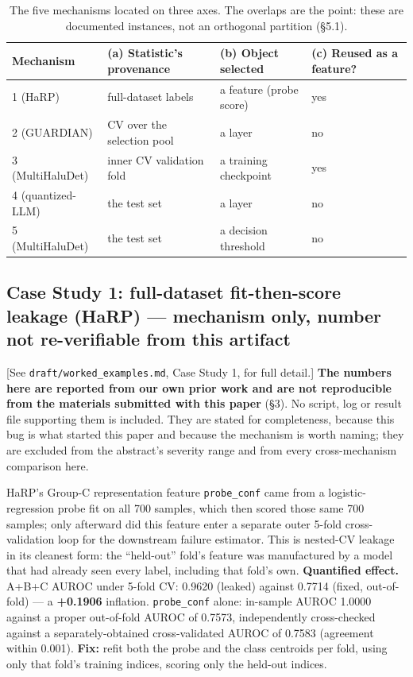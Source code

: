 \documentclass[10pt]{article} %
\begin{document}
\begin{table}[!ht]
\centering
\small
\begin{tabular}{llll}
\toprule
Mechanism & (a) Statistic's provenance & (b) Object selected & (c) Reused as a feature? \\
\midrule
1 (HaRP) & full-dataset labels & a feature (probe score) & yes \\
2 (GUARDIAN) & CV over the selection pool & a layer & no \\
3 (MultiHaluDet) & inner CV validation fold & a training checkpoint & yes \\
4 (quantized-LLM) & the test set & a layer & no \\
5 (MultiHaluDet) & the test set & a decision threshold & no \\
\bottomrule
\end{tabular}
\caption{The five mechanisms located on three axes. The overlaps are the
point: these are documented instances, not an orthogonal partition (§5.1).}
\end{table}

\subsection{Case Study 1: full-dataset fit-then-score leakage (HaRP) --- mechanism only, number not re-verifiable from this artifact}

[See \texttt{draft/worked\_examples.md}, Case Study 1, for full detail.]
\textbf{The numbers here are reported from our own prior work and are not
reproducible from the materials submitted with this paper} (§3). No script, log
or result file supporting them is included. They are stated for completeness,
because this bug is what started this paper and because the mechanism is worth
naming; they are excluded from the abstract's severity range and from every
cross-mechanism comparison here.

HaRP's Group-C representation feature \texttt{probe\_conf} came from a
logistic-regression probe fit on all 700 samples, which then scored those same
700 samples; only afterward did this feature enter a separate outer 5-fold
cross-validation loop for the downstream failure estimator. This is nested-CV
leakage in its cleanest form: the ``held-out'' fold's feature was manufactured
by a model that had already seen every label, including that fold's own.
\textbf{Quantified effect.} A+B+C AUROC under 5-fold CV: 0.9620 (leaked) against
0.7714 (fixed, out-of-fold) --- a \textbf{+0.1906} inflation.
\texttt{probe\_conf} alone: in-sample AUROC 1.0000 against a proper
out-of-fold AUROC of 0.7573, independently cross-checked against a
separately-obtained cross-validated AUROC of 0.7583 (agreement within 0.001).
\textbf{Fix:} refit both the probe and the class centroids per fold, using only
that fold's training indices, scoring only the held-out indices.
\end{document}
